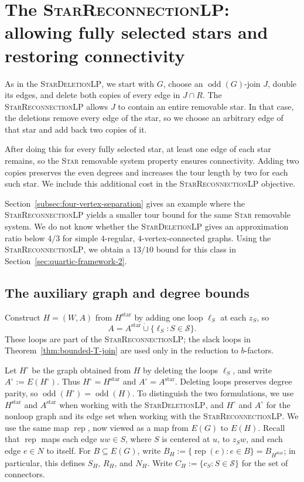 \documentclass[11pt]{amsart}
\DeclareMathOperator{\odd}{odd}
\newcommand{\rep}[1]{\operatorname{rep}(#1)}
\newcommand{\1}{\mathbbm{1}}
\newcommand{\LPone}{\textsc{StarDeletionLP}}
\newcommand{\LPtwo}{\textsc{StarReconnectionLP}}
\begin{document}
\section{The \LPtwo{}: allowing fully selected stars and restoring connectivity}
\label{sec:framework-2}


As in the \LPone{}, we start with $G$, choose an
$\odd(G)$-join $J$, double its edges, and delete both copies
of every edge in $J\cap R$. The \LPtwo{} allows $J$ to contain
an entire removable star. In that case, the deletions remove
every edge of the star, so we choose an arbitrary edge of that
star and add back two copies of it.

After doing this for every fully selected star, at least one
edge of each star remains, so the \textsc{Star} removable system property
ensures connectivity. Adding two copies preserves the even
degrees and increases the tour length by two for each such
star. We include this additional cost in the \LPtwo{} objective.

Section~\ref{subsec:four-vertex-separation} gives an example where the \LPtwo{} yields a smaller tour bound
for the same \textsc{Star} removable system. We do not know whether the \LPone{} gives an approximation ratio below $4/3$ for simple
$4$-regular, $4$-vertex-connected graphs. Using the \LPtwo{},
we obtain a $13/10$ bound for this class in
Section~\ref{sec:quartic-framework-2}.

\subsection{The auxiliary graph and degree bounds}
Construct $H=(W,A)$ from $H^{\mathrm{star}}$ by adding one loop $\ell_S$
at each $z_S$, so
\[
 A=A^{\mathrm{star}}\mathbin{\dot\cup}\{\ell_S:S\in\mathcal S\}.
\]
These loops are part of the \LPtwo{}; the slack loops in
Theorem~\ref{thm:bounded-T-join} are used only in the reduction
to $b$-factors.

Let $H^\circ$ be the graph obtained from $H$ by deleting the
loops $\ell_S$, and write $A^\circ:=E(H^\circ)$.
Thus $H^\circ=H^{\mathrm{star}}$ and
$A^\circ=A^{\mathrm{star}}$.
Deleting loops preserves degree parity, so
$\odd(H^\circ)=\odd(H)$.
To distinguish the two formulations, we use
$H^{\mathrm{star}}$ and $A^{\mathrm{star}}$ when working
with the \LPone{}, and $H^\circ$ and $A^\circ$ for the
nonloop graph and its edge set when working with the \LPtwo{}. We use the same map $\operatorname{rep}$, now viewed as a map
from $E(G)$ to $E(H)$. Recall that $\operatorname{rep}$ maps each edge $uw\in S$, where $S$ is centered at $u$,
to $z_Sw$, and each edge $e\in N$ to itself. For $B\subseteq E(G)$,
write $B_H:=\{\rep{e}:e\in B\}=B_{H^{\mathrm{star}}}$; in particular,
this defines $S_H$, $R_H$, and $N_H$.
Write $C_H:=\{c_S:S\in\mathcal S\}$ for the set of connectors.
\end{document}
